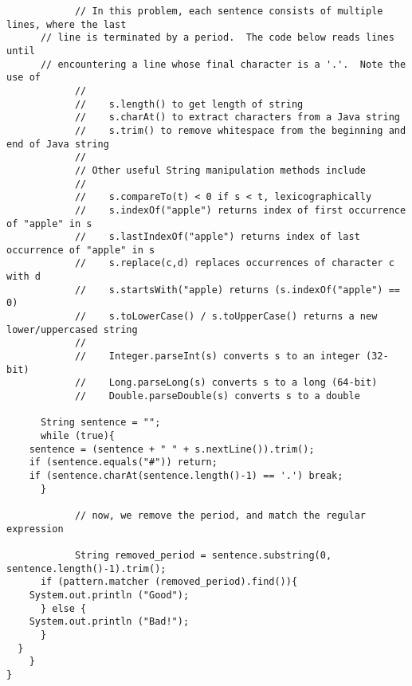 \begin{lstlisting}
            // In this problem, each sentence consists of multiple lines, where the last 
      // line is terminated by a period.  The code below reads lines until
      // encountering a line whose final character is a '.'.  Note the use of
            //
            //    s.length() to get length of string
            //    s.charAt() to extract characters from a Java string
            //    s.trim() to remove whitespace from the beginning and end of Java string
            //
            // Other useful String manipulation methods include
            //
            //    s.compareTo(t) < 0 if s < t, lexicographically
            //    s.indexOf("apple") returns index of first occurrence of "apple" in s
            //    s.lastIndexOf("apple") returns index of last occurrence of "apple" in s
            //    s.replace(c,d) replaces occurrences of character c with d
            //    s.startsWith("apple) returns (s.indexOf("apple") == 0)
            //    s.toLowerCase() / s.toUpperCase() returns a new lower/uppercased string
            //
            //    Integer.parseInt(s) converts s to an integer (32-bit)
            //    Long.parseLong(s) converts s to a long (64-bit)
            //    Double.parseDouble(s) converts s to a double
            
      String sentence = "";
      while (true){
    sentence = (sentence + " " + s.nextLine()).trim();
    if (sentence.equals("#")) return;
    if (sentence.charAt(sentence.length()-1) == '.') break;   
      }

            // now, we remove the period, and match the regular expression

            String removed_period = sentence.substring(0, sentence.length()-1).trim();
      if (pattern.matcher (removed_period).find()){
    System.out.println ("Good");
      } else {
    System.out.println ("Bad!");
      }
  }
    }
}

\end{lstlisting}
